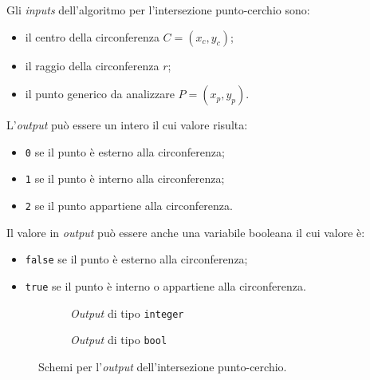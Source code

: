 Gli \textit{inputs} dell'algoritmo per l'intersezione punto-cerchio sono:
\begin{itemize}
	\item il centro della circonferenza $C = (x_c, y_c)$;
	\item il raggio della circonferenza $r$;
	\item il punto generico da analizzare $P=(x_p, y_p)$.
\end{itemize}
L'\textit{output} può essere un intero il cui valore risulta:
\begin{itemize}
	\item \texttt{0} se il punto è esterno alla circonferenza;
	\item \texttt{1} se il punto è interno alla circonferenza;
	\item \texttt{2} se il punto appartiene alla circonferenza.
\end{itemize}
Il valore in \textit{output} può essere anche una variabile booleana il cui valore è:
\begin{itemize}
	\item \texttt{false} se il punto è esterno alla circonferenza;
	\item \texttt{true} se il punto è interno o appartiene alla circonferenza.
\end{itemize}
%
\begin{figure}[h]
\hfill
	\begin{subfigure}{.45\textwidth}
	\centering
	\caption{\textit{Output} di tipo \texttt{integer}}
\end{subfigure}
\hfill
\begin{subfigure}{.45\textwidth}
	\centering
	\caption{\textit{Output} di tipo \texttt{bool}}
\end{subfigure}
\hfill
\caption{Schemi per l'\textit{output} dell'intersezione punto-cerchio.}
\end{figure}
